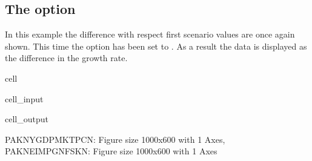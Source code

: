 \documentclass[letterpaper,10pt,english]{jupyterBook}
\begin{document}
\subsection{The  option}
\label{\detokenize{content/05_WBModels/ScenarioAnalysis:the-showtype-option}}
\sphinxAtStartPar
In this example the difference with respect first  scenario  values are once again shown. This time the  option has been set to .  As a result the data is displayed as the  difference in the growth rate.

\begin{sphinxuseclass}{cell}\begin{sphinxVerbatimInput}

\begin{sphinxuseclass}{cell_input}
\begin{sphinxVerbatim}[commandchars=\\\{\}]
  
\end{sphinxVerbatim}

\end{sphinxuseclass}\end{sphinxVerbatimInput}
\begin{sphinxVerbatimOutput}

\begin{sphinxuseclass}{cell_output}
\noindent{}

\noindent{}

\begin{sphinxVerbatim}[commandchars=\\\{\}]
\PYGZob{}\PYGZsq{}PAKNYGDPMKTPCN\PYGZsq{}: \PYGZlt{}Figure size 1000x600 with 1 Axes\PYGZgt{},
 \PYGZsq{}PAKNEIMPGNFSKN\PYGZsq{}: \PYGZlt{}Figure size 1000x600 with 1 Axes\PYGZgt{}\PYGZcb{}
\end{sphinxVerbatim}

\end{sphinxuseclass}\end{sphinxVerbatimOutput}

\end{sphinxuseclass}
\end{document}
